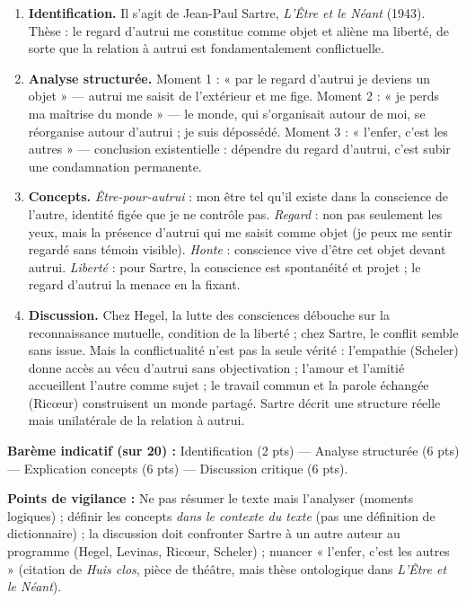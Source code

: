 \documentclass[11pt]{article}
\begin{document}
\begin{corrige}
\begin{enumerate}
    \item \textbf{Identification.} Il s'agit de Jean-Paul Sartre, \emph{L'Être et le Néant} (1943). Thèse : le regard d'autrui me constitue comme objet et aliène ma liberté, de sorte que la relation à autrui est fondamentalement conflictuelle.
    \item \textbf{Analyse structurée.} Moment 1 : « par le regard d'autrui je deviens un objet » — autrui me saisit de l'extérieur et me fige. Moment 2 : « je perds ma maîtrise du monde » — le monde, qui s'organisait autour de moi, se réorganise autour d'autrui ; je suis dépossédé. Moment 3 : « l'enfer, c'est les autres » — conclusion existentielle : dépendre du regard d'autrui, c'est subir une condamnation permanente.
    \item \textbf{Concepts.} \emph{Être-pour-autrui} : mon être tel qu'il existe dans la conscience de l'autre, identité figée que je ne contrôle pas. \emph{Regard} : non pas seulement les yeux, mais la présence d'autrui qui me saisit comme objet (je peux me sentir regardé sans témoin visible). \emph{Honte} : conscience vive d'être cet objet devant autrui. \emph{Liberté} : pour Sartre, la conscience est spontanéité et projet ; le regard d'autrui la menace en la fixant.
    \item \textbf{Discussion.} Chez Hegel, la lutte des consciences débouche sur la reconnaissance mutuelle, condition de la liberté ; chez Sartre, le conflit semble sans issue. Mais la conflictualité n'est pas la seule vérité : l'empathie (Scheler) donne accès au vécu d'autrui sans objectivation ; l'amour et l'amitié accueillent l'autre comme sujet ; le travail commun et la parole échangée (Ricœur) construisent un monde partagé. Sartre décrit une structure réelle mais unilatérale de la relation à autrui.
\end{enumerate}

\textbf{Barème indicatif (sur 20) :} Identification (2 pts) — Analyse structurée (6 pts) — Explication concepts (6 pts) — Discussion critique (6 pts).

\textbf{Points de vigilance :} Ne pas résumer le texte mais l'analyser (moments logiques) ; définir les concepts \emph{dans le contexte du texte} (pas une définition de dictionnaire) ; la discussion doit confronter Sartre à un autre auteur au programme (Hegel, Levinas, Ricœur, Scheler) ; nuancer « l'enfer, c'est les autres » (citation de \emph{Huis clos}, pièce de théâtre, mais thèse ontologique dans \emph{L'Être et le Néant}).
\end{corrige}
\end{document}
